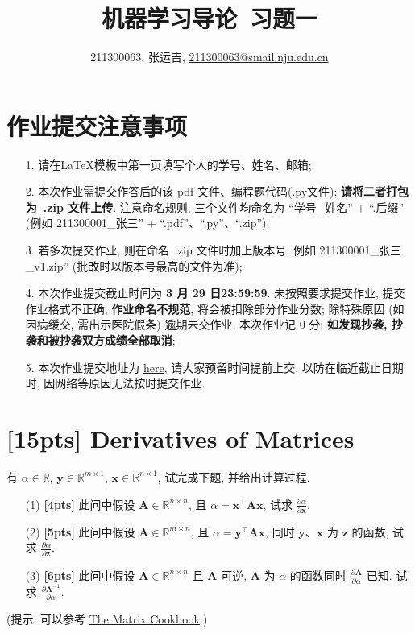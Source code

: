 \documentclass[a4paper,UTF8]{article}
\numberwithin{equation}{section}
\theoremstyle{definition}
\def \A {\mathbf{A}}
\def \y {\mathbf{y}}
\def \x {\mathbf{x}}
\def \z {\mathbf{z}}
\begin{document}
	\title{机器学习导论\ 习题一}
	\author{211300063, 张运吉, \href{mailto:邮箱}{211300063@smail.nju.edu.cn}}
	\maketitle
	\section*{作业提交注意事项}
	\begin{tcolorbox}
		\begin{enumerate}
			\item[1.] 请在LaTeX模板中第一页填写个人的学号、姓名、邮箱;
			\item[2.] 本次作业需提交作答后的该 pdf 文件、编程题代码(.py文件); {\color{red}\textbf{请将二者打包为~.zip 文件上传}}. 注意命名规则, 三个文件均命名为 “学号\_姓名” + “.后缀” (例如 211300001\_张三” + “.pdf”、“.py”、“.zip”);
			\item[3.] 若多次提交作业, 则在命名~.zip 文件时加上版本号, 例如 211300001\_张三\_v1.zip” (批改时以版本号最高的文件为准);
			\item[4.] 本次作业提交截止时间为 {\color{red}\textbf{ 3 月 29 日23:59:59}}. 未按照要求提交作业, 提交作业格式不正确, {\color{red}\textbf{作业命名不规范}}, 将会被扣除部分作业分数; 除特殊原因 (如因病缓交, 需出示医院假条) 逾期未交作业, 本次作业记 0 分; {\color{red}\textbf{如发现抄袭, 抄袭和被抄袭双方成绩全部取消}};
			\item[5.] 本次作业提交地址为 \href{https://box.nju.edu.cn/u/d/008080744a60484ea526/}{here}, 请大家预留时间提前上交, 以防在临近截止日期时, 因网络等原因无法按时提交作业.
		\end{enumerate}
	\end{tcolorbox}
	\newpage
	
	
	\section{[15pts] Derivatives of Matrices}
	有 $\alpha \in \mathbb{R}$, $\y\in \mathbb{R}^{m×1}$, $\x\in \mathbb{R}^{n×1}$, 试完成下题, 并给出计算过程.
	\begin{enumerate}
		\item[(1)] \textbf{[4pts]} 此问中假设 $\A\in \mathbb{R}^{n×n}$, 且 $\alpha=\x^\top\A\x$, 试求 $\frac{\partial \alpha}{\partial \x}$.
		\item[(2)] \textbf{[5pts]} 此问中假设 $\A\in \mathbb{R}^{m×n}$, 且 $\alpha=\y^\top\A\x$, 同时 $\y$、$\x$ 为 $\z$ 的函数, 试求 $\frac{\partial \alpha}{\partial \z}$.
		\item[(3)] \textbf{[6pts]} 此问中假设 $\A\in \mathbb{R}^{n×n}$ 且 $\A$ 可逆, $\A$ 为 $\alpha$ 的函数同时 $\frac{\partial \A}{\partial \alpha}$ 已知. 试求 $\frac{\partial \A^{-1}}{\partial \alpha}$.
	\end{enumerate}
	(提示: 可以参考 \href{https://www.math.uwaterloo.ca/~hwolkowi/matrixcookbook.pdf}{The Matrix Cookbook}.)
	
\end{document}
